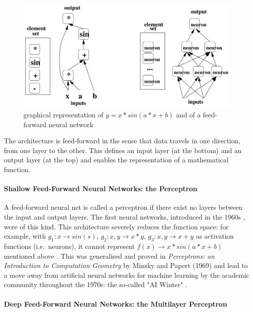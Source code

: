 \documentclass[a4paper,11pt]{article}
\begin{document}
\begin{figure}[h!]
	\centering
	\includegraphics[scale=0.3]{images/NN_math_rep.png}
	\caption{graphical representation of $y = x*sin(a*x+b)$ and of a feed-forward neural network}
\end{figure}

The architecture is feed-forward in the sense that data travels in one direction, from one layer to the other. This defines an input layer (at the bottom) and an output layer (at the top) and enables the representation of a mathematical function.

\paragraph{Shallow Feed-Forward Neural Networks: the Perceptron} 

A feed-forward neural net is called a perceptron if there exist no layers between the input and output layers. The first neural networks, introduced in the 1960s \cite{DL-book}, were of this kind. This architecture severely reduces the function space: for example, with $g_{1}: x \rightarrow sin(s)$, $g_{2}: x,y \rightarrow x*y$, $g_{3}: x,y \rightarrow x+y$ as activation functions (i.e.\ neurons), it cannot represent $f(x) \rightarrow x*sin(a*x+b)$ mentioned above \cite{DL-book}. This was generalised and proved in \textit{Perceptrons: an Introduction to Computation Geometry} by Minsky and Papert (1969) and lead to a move away from artificial neural networks for machine learning by the academic community throughout the 1970s: the so-called "AI Winter" \cite{Russel & Norvig}. 

\paragraph{Deep Feed-Forward Neural Networks: the Multilayer Perceptron} 
\end{document}
